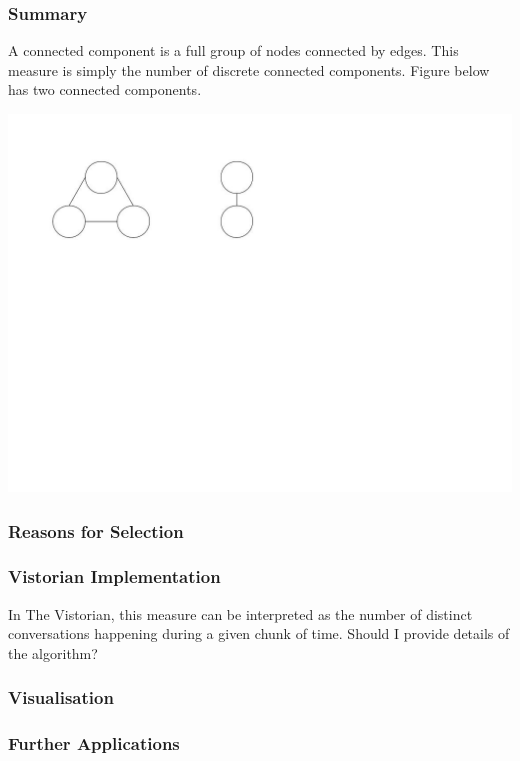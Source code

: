 \subsubsection{Summary}
A connected component is a full group of nodes connected by edges. This measure is simply the number of discrete connected components.
Figure below has two connected components.

\begin{center}
\includegraphics[trim={0cm, 20cm, -10cm, 0cm}, width=180mm]{./Figures/connectedComponents1.jpg}
\end{center}

\subsubsection{Reasons for Selection}
\subsubsection{Vistorian Implementation}
In The Vistorian, this measure can be interpreted as the number of distinct conversations happening during a given chunk of time. 
Should I provide details of the algorithm?

\subsubsection{Visualisation}
\subsubsection{Further Applications}

